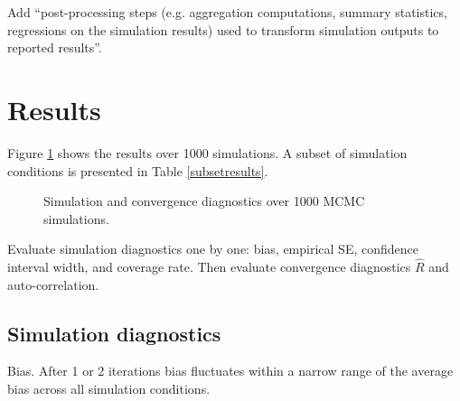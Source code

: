 \documentclass[article]{jss}
\begin{document}
Add ``post-processing steps (e.g. aggregation computations, summary statistics, regressions on the simulation results) used to transform simulation outputs to reported results''. %





\section{Results}

Figure \ref{resultssim} shows the results over 1000 simulations. A subset of simulation conditions is presented in Table \ref{subsetresults}. 

\begin{figure}[h]
  \caption{Simulation and convergence diagnostics over 1000 MCMC simulations.}
    \label{resultssim}
\end{figure}

Evaluate simulation diagnostics one by one: bias, empirical SE, confidence interval width, and coverage rate. Then evaluate convergence diagnostics $\widehat{R}$ and auto-correlation.

\subsection{Simulation diagnostics}
Bias. After 1 or 2 iterations bias fluctuates within a narrow range of the average bias across all simulation conditions.
\end{document}
